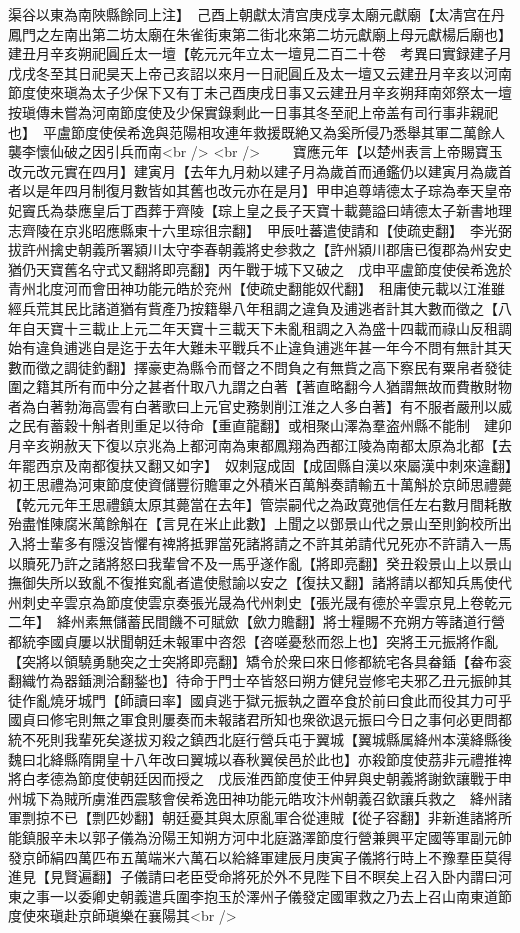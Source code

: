 渠谷以東為南陜縣餘同上注】　己酉上朝獻太清宫庚戍享太廟元獻廟【太凊宫在丹鳳門之左南出第二坊太廟在朱雀街東第二街北來第二坊元獻廟上母元獻楊后廟也】建丑月辛亥朔祀圓丘太一壇【乾元元年立太一壇見二百二十卷　考異曰實録建子月戊戌冬至其日祀昊天上帝己亥詔以來月一日祀圓丘及太一壇又云建丑月辛亥以河南節度使來瑱為太子少保下又有丁未己酉庚戌日事又云建丑月辛亥朔拜南郊祭太一壇按瑱傳未嘗為河南節度使及少保實錄剩此一日事其冬至祀上帝盖有司行事非親祀也】　平盧節度使侯希逸與范陽相攻連年救援既絶又為奚所侵乃悉舉其軍二萬餘人襲李懷仙破之因引兵而南<br />
<br />
　　寶應元年【以楚州表言上帝賜寶玉改元改元實在四月】建寅月【去年九月勑以建子月為歲首而通鑑仍以建寅月為歲首者以是年四月制復月數皆如其舊也改元亦在是月】甲申追尊靖德太子琮為奉天皇帝妃竇氏為㳟應皇后丁酉葬于齊陵【琮上皇之長子天寶十載薨謚曰靖德太子新書地理志齊陵在京兆昭應縣東十六里琮徂宗翻】　甲辰吐蕃遣使請和【使疏吏翻】　李光弼拔許州擒史朝義所署潁川太守李春朝義將史参救之【許州潁川郡唐已復郡為州安史猶仍天寶舊名守式又翻將即亮翻】丙午戰于城下又破之　戊申平盧節度使侯希逸於青州北度河而會田神功能元皓於兖州【使疏史翻能奴代翻】　租庸使元載以江淮雖經兵荒其民比諸道猶有貲產乃按籍舉八年租調之違負及逋逃者計其大數而徵之【八年自天寶十三載止上元二年天寶十三載天下未亂租調之入為盛十四載而祿山反租調始有違負逋逃自是迄于去年大難未平戰兵不止違負逋逃年甚一年今不問有無計其天數而徵之調徒釣翻】擇豪吏為縣令而督之不問負之有無貲之高下察民有粟帛者發徒圍之籍其所有而中分之甚者什取八九謂之白著【著直略翻今人猶謂無故而費散財物者為白著勃海高雲有白著歌曰上元官史務剝削江淮之人多白著】有不服者嚴刑以威之民有蓄穀十斛者則重足以待命【重直龍翻】或相聚山澤為羣盗州縣不能制　建卯月辛亥朔赦天下復以京兆為上都河南為東都鳳翔為西都江陵為南都太原為北都【去年罷西京及南都復扶又翻又如字】　奴刺寇成固【成固縣自漢以來屬漢中刺來違翻】初王思禮為河東節度使資儲豐衍贍軍之外積米百萬斛奏請輸五十萬斛於京師思禮薨【乾元元年王思禮鎮太原其薨當在去年】管崇嗣代之為政寛弛信任左右數月間耗散殆盡惟陳腐米萬餘斛在【言見在米止此數】上聞之以鄧景山代之景山至則鉤校所出入將士輩多有隱沒皆懼有禆將抵罪當死諸將請之不許其弟請代兄死亦不許請入一馬以贖死乃許之諸將怒曰我輩曾不及一馬乎遂作亂【將即亮翻】癸丑殺景山上以景山撫御失所以致亂不復推䆒亂者遣使慰諭以安之【復扶又翻】諸將請以都知兵馬使代州刺史辛雲京為節度使雲京奏張光晟為代州刺史【張光晟有德於辛雲京見上卷乾元二年】　絳州素無儲蓄民間饑不可賦歛【歛力贍翻】將士糧賜不充朔方等諸道行營都統李國貞屢以狀聞朝廷未報軍中咨怨【咨嗟憂愁而怨上也】突將王元振將作亂【突將以領驍勇馳突之士突將即亮翻】矯令於衆曰來日修都統宅各具畚鍤【畚布衮翻織竹為器鍤測洽翻鍫也】待命于門士卒皆怒曰朔方健兒豈修宅夫邪乙丑元振帥其徒作亂燒牙城門【師讀曰率】國貞逃于獄元振執之置卒食於前曰食此而役其力可乎國貞曰修宅則無之軍食則屢奏而未報諸君所知也衆欲退元振曰今日之事何必更問都統不死則我輩死矣遂拔刃殺之鎮西北庭行營兵屯于翼城【翼城縣属絳州本漢絳縣後魏曰北絳縣隋開皇十八年改曰翼城以春秋翼侯邑於此也】亦殺節度使茘非元禮推禆將白孝德為節度使朝廷因而授之　戊辰淮西節度使王仲昇與史朝義將謝欽讓戰于申州城下為賊所虜淮西震駭會侯希逸田神功能元皓攻汴州朝義召欽讓兵救之　絳州諸軍剽掠不已【剽匹妙翻】朝廷憂其與太原亂軍合從連賊【從子容翻】非新進諸將所能鎮服辛未以郭子儀為汾陽王知朔方河中北庭潞澤節度行營兼興平定國等軍副元帥發京師絹四萬匹布五萬端米六萬石以給絳軍建辰月庚寅子儀將行時上不豫羣臣莫得進見【見賢遍翻】子儀請曰老臣受命將死於外不見陛下目不瞑矣上召入卧内謂曰河東之事一以委卿史朝義遣兵圍李抱玉於澤州子儀發定國軍救之乃去上召山南東道節度使來瑱赴京師瑱樂在襄陽其<br />

